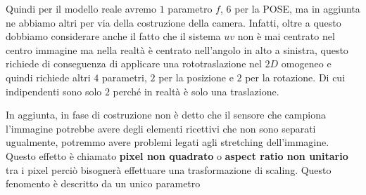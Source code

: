 Quindi per il modello reale avremo $1$ parametro $f$, $6$ per la POSE, ma in aggiunta
ne abbiamo altri per via della costruzione della camera. Infatti, oltre a questo 
dobbiamo considerare anche il fatto che il sistema $uv$ non è mai centrato nel 
centro immagine ma nella realtà è centrato nell'angolo in alto a sinistra, questo 
richiede di conseguenza di applicare una rototraslazione nel $2D$ omogeneo e quindi 
richiede altri $4$ parametri, $2$ per la posizione e $2$ per la rotazione. Di cui 
indipendenti sono solo $2$ perché in realtà è solo una traslazione. 

In aggiunta, in fase di costruzione non è detto che il sensore che campiona l'immagine 
potrebbe avere degli elementi ricettivi che non sono separati ugualmente, potremmo 
avere problemi legati agli stretching dell'immagine. Questo effetto è chiamato 
\textbf{pixel non quadrato} o \textbf{aspect ratio non unitario} tra i pixel perciò
bisognerà effettuare una trasformazione di scaling. Questo fenomento è descritto 
da un unico parametro 